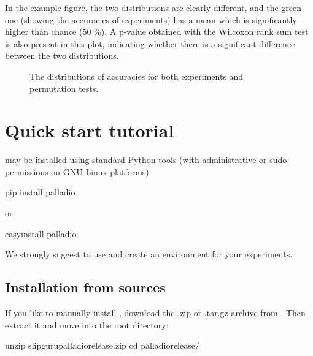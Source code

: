 \documentclass[letterpaper,10pt,english]{sphinxmanual}
\begin{document}
In the example figure, the two distributions are clearly different, and the green one (showing the accuracies of  experiments) has a mean which is significantly higher than chance (50 \%). A p-value obtained with the Wilcoxon rank sum test is also present in this plot, indicating whether there is a significant difference between the two distributions.
\begin{figure}[htbp]
\centering
\capstart

\noindent{}
\caption{The distributions of accuracies for both  experiments and permutation tests.}\label{\detokenize{framework:permutation-acc-distribution}}\end{figure}


\section{Quick start tutorial}
\label{\detokenize{tutorial::doc}}\label{\detokenize{tutorial:quick-start-tutorial}}\label{\detokenize{tutorial:tutorial}}
 may be installed using standard Python tools (with
administrative or sudo permissions on GNU-Linux platforms):

\begin{sphinxVerbatim}[commandchars=\\\{\}]
\PYGZdl{} pip install palladio

or

\PYGZdl{} easy\PYGZus{}install palladio
\end{sphinxVerbatim}

We strongly suggest to use  and create an environment for your experiments.


\subsection{Installation from sources}
\label{\detokenize{tutorial:installation-from-sources}}
If you like to manually install , download the .zip or .tar.gz archive
from . Then extract it and move into the root directory:

\begin{sphinxVerbatim}[commandchars=\\\{\}]
\PYGZdl{} unzip slipguru\PYGZhy{}palladio\PYGZhy{}\textbar{}release\textbar{}.zip
\PYGZdl{} cd palladio\PYGZhy{}\textbar{}release\textbar{}/
\end{sphinxVerbatim}
\end{document}
